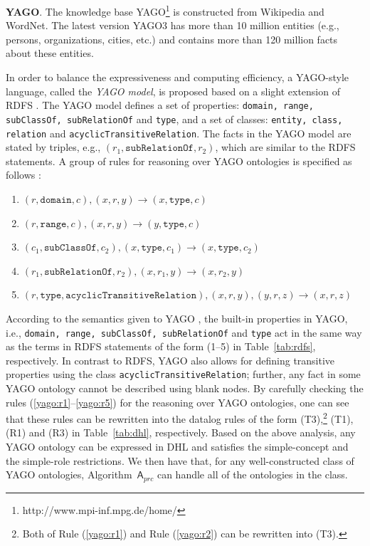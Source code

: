 \textbf{YAGO}. The knowledge base YAGO\footnote{http://www.mpi-inf.mpg.de/home/}
is constructed from Wikipedia and WordNet. The latest version
YAGO3 \cite{MahdisoltaniBS15} has more than 10 million entities
(e.g., persons, organizations, cities, etc.)
and contains more than 120 million facts about these entities.

In order to balance the expressiveness and computing efficiency,
a YAGO-style language, called the \emph{YAGO model}, is proposed based on
a slight extension of RDFS \cite{SuchanekKW08}. The YAGO model defines
a set of properties: \texttt{domain, range, subClassOf, subRelationOf} and \texttt{type},
and a set of classes: \texttt{entity, class, relation} and \texttt{acyclicTransitiveRelation}.
The facts in the YAGO model are stated by triples, e.g., $(r_1,
\texttt{subRelationOf}, r_2)$,
which are similar to the RDFS statements.
A group of rules for reasoning over YAGO ontologies
is specified as follows \cite{SuchanekKW08}:
\begin{enumerate}[leftmargin=8ex,label=(\arabic*),ref=\arabic*]
  \item $(r,\texttt{domain}, c), (x, r, y) \rightarrow (x,
    \texttt{type}, c)$\label{yago:r1}
  \item $(r,\texttt{range}, c), (x, r, y) \rightarrow (y,
    \texttt{type}, c)$\label{yago:r2}
  \item $(c_1, \texttt{subClassOf}, c_2), (x, \texttt{type}, c_1)
    \rightarrow (x, \texttt{type}, c_2)$\label{yago:r3}
  \item $(r_1, \texttt{subRelationOf}, r_2), (x, r_1, y) \rightarrow
    (x, r_2, y)$\label{yago:r4}
  \item $(r, \texttt{type}, \texttt{acyclicTransitiveRelation}), (x,
    r, y), (y, r, z) \rightarrow (x, r, z)$\label{yago:r5}
\end{enumerate}

According to the semantics given to YAGO \cite{SuchanekKW08}, the built-in properties in YAGO,
i.e., \texttt{domain, range, subClassOf, subRelationOf} and \texttt{type} act in the same
way as the terms in RDFS statements of the form (1--5) in Table~\ref{tab:rdfs}, respectively.
In contrast to RDFS, YAGO also allows for defining
transitive properties using the
class \texttt{acyclicTransitiveRelation}; further, any fact in some YAGO ontology cannot be
described using blank nodes. By carefully checking the rules (\ref{yago:r1}--\ref{yago:r5}) for the reasoning over YAGO ontologies,
one can see that these rules can be rewritten into the datalog rules
of the form (T3),\footnote{Both of Rule (\ref{yago:r1}) and
Rule (\ref{yago:r2}) can be rewritten into (T3).} (T1), (R1) and (R3) in Table~\ref{tab:dhl}, respectively.
Based on the above analysis, any YAGO ontology can be expressed in DHL
and satisfies the simple-concept and the simple-role restrictions. We then have that,
for any well-constructed class of YAGO ontologies,
Algorithm~$\mathsf{A}_{prc}$ 
can handle all of the ontologies in the class.

